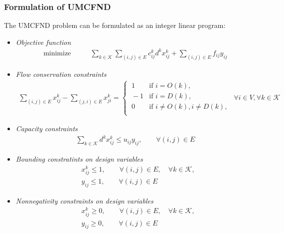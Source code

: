 \subsubsection*{Formulation of UMCFND}
The UMCFND problem can be formulated as an integer linear program:
\begin{itemize}
    \item\textit{Objective function}
    \label{eq:obf}
        \begin{align}
            \text{minimize}\qquad &\sum_{k\in \mathcal{K}}\sum_{(i,j)\in E} c_{ij}^k d^k x_{ij}^k + \sum_{(i,j)\in E} f_{ij}y_{ij}
        \end{align}
        
    \item\textit{Flow conservation constraints}
        \begin{align}
        \label{eq: Conservation constraints}
            \sum_{(i,j)\in E}x_{ij}^k - \sum_{(j,i)\in E}x_{ji}^k = 
            \begin{cases}
            \ 1 & \text{if } i = O(k),\\
            \ -1 & \text{if } i = D(k),\\
            \ 0 & \text{if } i \neq O(k), i \neq D(k),\\
            \end{cases} \ \  \forall i \in V, \forall k \in \mathcal{K}
        \end{align}
        
    \item\textit{Capacity constraints}
        \begin{align}
        \label{eq:Capacity constraints}
            \sum_{k\in \mathcal{K}} d^kx_{ij}^k \leq u_{ij}y_{ij}, \qquad \forall (i, j) \in E
        \end{align}

    \item\textit{Bounding constratints on design variables}
        \begin{align}
            &x_{ij}^k \leq 1, \qquad  \forall (i, j) \in E, \quad\forall k \in \mathcal{K},\label{eq:Bounding on design var1}\\
            &y_{ij} \leq 1, \qquad  \forall (i, j) \in E
        \end{align}
        
    \item\textit{Nonnegativity constraints on design variables}
        \begin{align}
        \label{eq:Nonnegativity on design var}
            &x_{ij}^k \geq 0, \qquad  \forall (i, j) \in E, \quad\forall k \in \mathcal{K},\\
            &y_{ij} \geq 0, \qquad  \forall (i, j) \in E
        \end{align}
    

\end{itemize}
